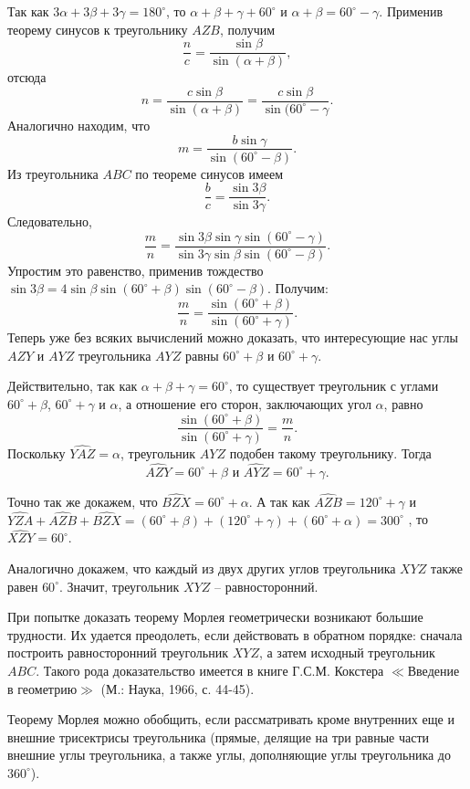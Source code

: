 \documentclass{article}
\begin{document}
\par Так как $3\alpha+3\beta+3\gamma=180^{\circ}$, то $\alpha+\beta+\gamma+60^{\circ}$ и $\alpha+\beta=60^{\circ}-\gamma$. Применив теорему синусов к треугольнику $AZB$, получим $$\frac{n}{c} =\frac{\sin\beta}{\sin(\alpha+\beta)},$$
отсюда $$n=\frac{c\sin\beta}{\sin(\alpha+\beta)}=\frac{c\sin\beta}{\sin(60^{\circ}-\gamma}.$$
Аналогично находим, что $$m=\frac{b\sin\gamma}{\sin(60^{\circ}-\beta)}.$$
Из треугольника $ABC$ по теореме синусов  имеем $$\frac{b}{c}=\frac{\sin3\beta}{\sin 3\gamma}.$$
Следовательно, $$\frac{m}{n}=\frac{\sin3\beta\sin\gamma\sin(60^{\circ}-\gamma)}{\sin 3\gamma\sin\beta\sin(60^{\circ}-\beta)}.$$
Упростим это равенство, применив тождество $\sin 3 \beta=4 \sin \beta \sin(60^{\circ}+\beta)\sin(60^{\circ}-\beta)$. Получим: $$ \frac{m}{n}=\frac{\sin(60^{\circ}+\beta)}{\sin(60^{\circ}+\gamma)}.$$
Теперь уже без всяких вычислений можно доказать, что интересующие нас углы $AZY$ и $AYZ$ треугольника $AYZ$ равны $60^{\circ}+\beta$ и $60^{\circ}+\gamma$.
\par Действительно, так как $\alpha+\beta+\gamma=60^{\circ}$, то существует треугольник с углами $60^{\circ}+\beta$, $60^{\circ}+\gamma$ и $\alpha$, а отношение его сторон, заключающих угол $\alpha$, равно $$\frac{\sin(60^{\circ}+\beta)}{\sin(60^{\circ}+\gamma)}=\frac{m}{n}.$$
Поскольку $\widehat{YAZ}=\alpha$, треугольник $AYZ$ подобен такому треугольнику. Тогда $$\widehat{AZY}=60^{\circ}+\beta \mbox{ и } \widehat{AYZ}=60^{\circ}+\gamma.$$
\par Точно так же докажем, что $\widehat{BZX}=60^{\circ}+\alpha$.  А так как $\widehat{AZB}=120^{\circ}+\gamma$ и $\widehat{YZA}+\widehat{AZB}+\widehat{BZX}=(60^{\circ}+\beta)+(120^{\circ}+\gamma)+(60^{\circ}+\alpha)=300^{\circ}$
, то    $\widehat{XZY}=60^{\circ}.$ 
\par Аналогично докажем, что каждый из двух других углов треугольника $XYZ$ также равен $60^{\circ}$. Значит, треугольник $XYZ$ -- равносторонний.
\par При попытке доказать теорему Морлея геометрически возникают большие трудности. Их удается преодолеть, если действовать в обратном порядке: сначала построить равносторонний треугольник $XYZ$, а затем исходный треугольник $ABC$. Такого рода доказательство имеется в книге Г.С.М. Кокстера  $\ll$Введение в геометрию$\gg$ (М.: Наука, 1966, с. 44-45).
\par Теорему Морлея можно обобщить, если рассматривать кроме внутренних еще и внешние трисектрисы треугольника (прямые, делящие на три равные части внешние углы треугольника, а также углы, дополняющие углы треугольника до $360^{\circ}$).
\end{document}
